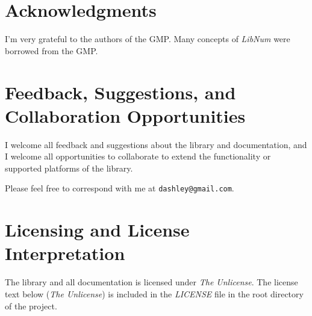 \section{Acknowledgments}
\label{ciov0:sack0}
 
I'm very grateful to the authors of the GMP. Many concepts
of \emph{LibNum} were borrowed from the GMP.


\section{Feedback, Suggestions, and Collaboration Opportunities}
\label{ciov0:sfbk0}

I welcome all feedback and suggestions about the library and 
documentation, and I welcome all opportunities to collaborate to extend 
the functionality or supported platforms of the library.  

Please feel free to correspond with me at \texttt{dashley@\-gmail.com}.


\section{Licensing and License Interpretation}
\label{ciov0:slip0}

The \emph{\productbasenameshort{}} library and all 
documentation is licensed under
\emph{The Unlicense}.  The 
license text below (\emph{The Unlicense}) is included in the 
\emph{LICENSE} file in the root directory of the project.  

